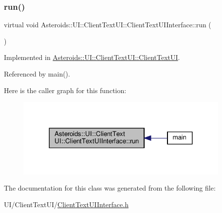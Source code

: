 \subsubsection{\texorpdfstring{run()}{run()}}
{\footnotesize\ttfamily virtual void Asteroids\+::\+U\+I\+::\+Client\+Text\+U\+I\+::\+Client\+Text\+U\+I\+Interface\+::run (\begin{DoxyParamCaption}{ }\end{DoxyParamCaption})\hspace{0.3cm}{\ttfamily [pure virtual]}}



Implemented in \hyperlink{classAsteroids_1_1UI_1_1ClientTextUI_1_1ClientTextUI_a835f455a627e77a5ef99661350281ec3}{Asteroids\+::\+U\+I\+::\+Client\+Text\+U\+I\+::\+Client\+Text\+UI}.



Referenced by main().

Here is the caller graph for this function\+:\nopagebreak
\begin{figure}[H]
\begin{center}
\leavevmode
\includegraphics[width=300pt]{classAsteroids_1_1UI_1_1ClientTextUI_1_1ClientTextUIInterface_a9eba8946cd9262221e8b55cea4acd92d_icgraph}
\end{center}
\end{figure}


The documentation for this class was generated from the following file\+:\begin{DoxyCompactItemize}
\item 
U\+I/\+Client\+Text\+U\+I/\hyperlink{ClientTextUIInterface_8h}{Client\+Text\+U\+I\+Interface.\+h}\end{DoxyCompactItemize}
